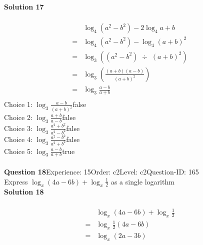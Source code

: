 \documentclass{article}
\begin{document}
\noindent\textbf{Solution 17}\\[2pt]
\\[-35pt]\begin{align*}
&\log_{4}(a^2-b^2)-2\log_{4}a+b\\[2pt]
=&\log_{4}(a^2-b^2)-\log_{4}(a+b)^2\\[2pt]
=&\log_{3}((a^2-b^2) \,\, \div \,\, (a+b)^2)\\[2pt]
=&\log_{3}\left(\displaystyle\frac{(a+b)(a-b)}{(a+b)^2}\right)\\[2pt]
=&\log_{3}\displaystyle\frac{a-b}{a+b}\\[-130pt]
\end{align*}
Choice 1: \hspace{20pt}$\log_{3}\displaystyle\frac{a-b}{(a+b)^2}$\hspace{20pt}false\\
Choice 2: \hspace{20pt}$\log_{3}\displaystyle\frac{a+b}{a-b}$\hspace{20pt}false\\
Choice 3: \hspace{20pt}$\log_{3}\displaystyle\frac{a^2+b^2}{a^2-b^2}$\hspace{20pt}false\\
Choice 4: \hspace{20pt}$\log_{3}\displaystyle\frac{a^2-b^2}{a^2+b^2}$\hspace{20pt}false\\
Choice 5: \hspace{20pt}$\log_{3}\displaystyle\frac{a-b}{a+b}$\hspace{20pt}true\\
\\[4pt]
\noindent\textbf{Question 18}\hspace{20pt}Experience: 15\hspace{20pt}Order: c2\hspace{20pt}Level: c2\hspace{20pt}Question-ID: 165\\[2pt]
Express $\log_{x}(4a-6b)+\log_{x}\displaystyle\frac{1}{2}$ as a single logarithm\\[4pt]
\noindent\textbf{Solution 18}\\[2pt]
\\[-35pt]\begin{align*}
&\log_{x}(4a-6b)+\log_{x}\displaystyle\frac{1}{2}\\[2pt]
=&\log_{x}\displaystyle\frac{1}{2}(4a-6b)\\[2pt]
=&\log_{x}(2a-3b)
\end{align*}
\end{document}
